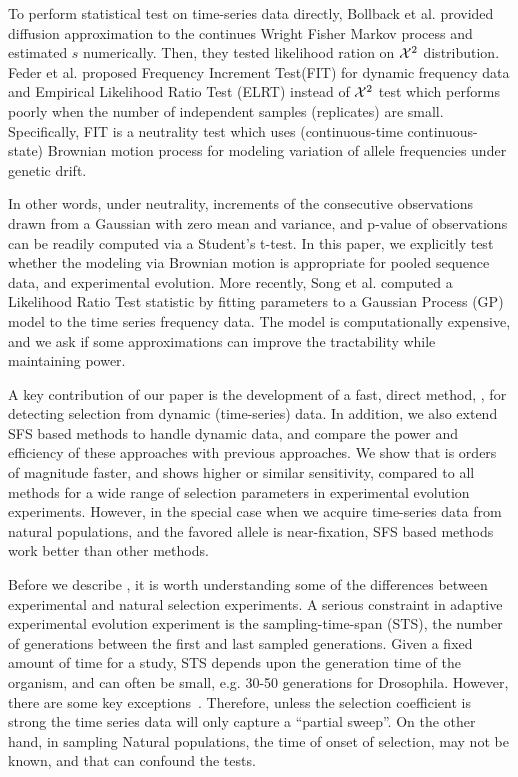 \documentclass[11pt]{article}
\def\comale{\text{COMALE }}
\begin{document}
To perform statistical test on time-series data directly, Bollback et
al. \cite{bollback2008estimation} provided diffusion approximation to
the continues Wright Fisher Markov process and estimated $s$
numerically. Then, they tested likelihood ration on ${\cal X}^2$
distribution. Feder et al. \cite{feder2014Identifying} proposed
Frequency Increment Test(FIT) for dynamic frequency data and Empirical
Likelihood Ratio Test (ELRT) instead of ${\cal X}^2$ test which performs
poorly when the number of independent samples (replicates) are small.
Specifically, FIT is a neutrality test which uses (continuous-time
continuous-state) Brownian motion process for modeling variation of
allele frequencies under genetic drift. 

In other words, under neutrality, increments of the consecutive
observations drawn from a Gaussian with zero mean and variance, and
p-value of observations can be readily computed via a Student's
t-test. In this paper, we explicitly test whether the modeling via
Brownian motion is appropriate for pooled sequence data, and
experimental evolution.  More recently, Song et al.
\cite{Terhorst2015Multi} computed a Likelihood Ratio Test statistic by
fitting parameters to a Gaussian Process (GP) model to the time series
frequency data. The model is computationally expensive, and we ask if
some approximations can improve the tractability while maintaining
power.

A key contribution of our paper is the development of a fast, direct
method, \comale, for detecting selection from dynamic (time-series)
data. In addition, we also extend SFS based methods to handle dynamic
data, and compare the power and efficiency of these approaches with
previous approaches. We show that \comale is orders of magnitude
faster, and shows higher or similar sensitivity, compared to all
methods for a wide range of selection parameters in experimental
evolution experiments.  However, in the special case when we acquire
time-series data from natural populations, and the favored allele is
near-fixation, SFS based methods work better than other methods.

Before we describe \comale, it is worth understanding some of the
differences between experimental and natural selection experiments. A
serious constraint in adaptive experimental evolution experiment is
the sampling-time-span (STS), the number of generations between the
first and last sampled generations. Given a fixed amount of time for a
study, STS depends upon the generation time of the organism, and can
often be small, e.g. 30-50 generations for Drosophila. However, there
are some key exceptions~\cite{Zhou}. Therefore, unless the selection
coefficient is strong the time series data will only capture a
``partial sweep''. On the other hand, in sampling Natural populations,
the time of onset of selection, may not be known, and that can
confound the tests.
\end{document}
